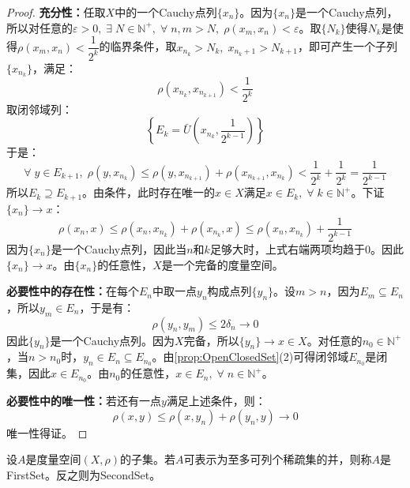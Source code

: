 \begin{proof}
	\textbf{充分性：}任取$X$中的一个Cauchy点列$\{x_n\}$。因为$\{x_n\}$是一个Cauchy点列，所以对任意的$\varepsilon>0,\;\exists\;N\in\mathbb{N}^+,\;\forall\;n,m>N,\;\rho(x_m,x_n)<\varepsilon$。取$\{N_k\}$使得$N_k$是使得$\rho(x_m,x_n)<\dfrac{1}{2^k}$的临界条件，取$x_{n_k}>N_k,\;x_{n_k+1}>N_{k+1}$，即可产生一个子列 $\{x_{n_k}\}$，满足：
	\begin{equation*}
		\rho(x_{n_k},x_{n_{k+1}})<\frac{1}{2^k}
	\end{equation*}
	取闭邻域列：
	\begin{equation*}
		\left\{E_k=\bar{U}\left(x_{n_k},\frac{1}{2^{k-1}}\right)\right\}
	\end{equation*}
	于是：
	\begin{equation*}
		\forall\;y\in E_{k+1},\;\rho(y,x_{n_k})\leqslant\rho(y,x_{n_{k+1}})+\rho(x_{n_{k+1}},x_{n_k})<\frac{1}{2^k}+\frac{1}{2^k}=\frac{1}{2^{k-1}}
	\end{equation*}
	所以$E_k\supseteq E_{k+1}$。由条件，此时存在唯一的$x\in X$满足$x\in E_k,\;\forall\;k\in\mathbb{N}^+$。下证$\{x_n\}\to x$：
	\begin{equation*}
		\rho(x_n,x)\leqslant\rho(x_n,x_{n_k})+\rho(x_{n_k},x)\leqslant\rho(x_n,x_{n_k})+\frac{1}{2^{k-1}}
	\end{equation*}
	因为$\{x_n\}$是一个Cauchy点列，因此当$n$和$k$足够大时，上式右端两项均趋于$0$。因此$\{x_n\}\to x$。由$\{x_n\}$的任意性，$X$是一个完备的度量空间。\par
	\textbf{必要性中的存在性：}在每个$E_n$中取一点$y_n$构成点列$\{y_n\}$。设$m>n$，因为$E_m\subseteq E_n$，所以$y_m\in E_n$，于是有：
	\begin{equation*}
		\rho(y_n,y_m)\leqslant2\delta_n\to0
	\end{equation*}
	因此$\{y_n\}$是一个Cauchy点列。因为$X$完备，所以$\{y_n\}\to x\in X$。对任意的$n_0\in\mathbb{N}^+$，当$n>n_0$时，$y_n\in E_n\subseteq E_{n_0}$。由\cref{prop:OpenClosedSet}(2)可得闭邻域$E_{n_0}$是闭集，因此$x\in E_{n_0}$。由$n_0$的任意性，$x\in E_n,\;\forall\;n\in\mathbb{N}^+$。\par
	\textbf{必要性中的唯一性：}若还有一点$y$满足上述条件，则：
	\begin{equation*}
		\rho(x,y)\leqslant\rho(x,y_n)+\rho(y_n,y)\to0
	\end{equation*}
	唯一性得证。
\end{proof}
\begin{definition}
	设$A$是度量空间$(X,\rho)$的子集。若$A$可表示为至多可列个稀疏集的并，则称$A$是\gls{FirstSet}。反之则为\gls{SecondSet}。
\end{definition}
